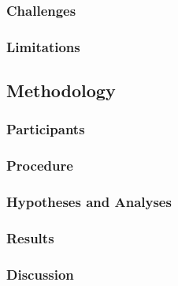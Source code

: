 \subsubsection{Challenges}


\subsubsection{Limitations}


\subsection{Methodology}


\subsubsection{Participants}


\subsubsection{Procedure}


\subsubsection{Hypotheses and Analyses}


\subsubsection{Results}


\subsubsection{Discussion}

